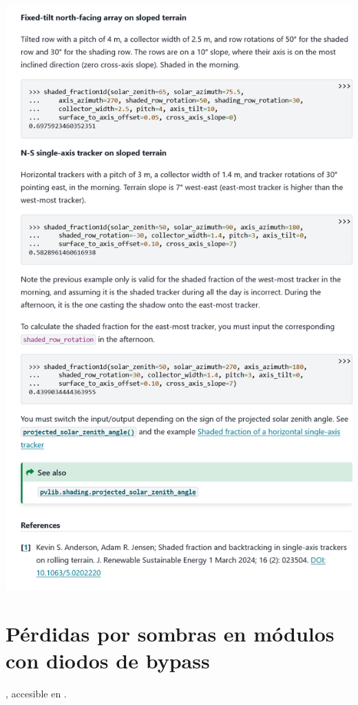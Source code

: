 \begin{myparindent}{0pt}
\includegraphics[width=\linewidth,height=0.9\textheight,keepaspectratio]{images/docs_funcs_cut/shaded_fraction1d_2.png}

\newpage\section{Pérdidas por sombras en módulos con diodos de bypass} \label{sct:doc_modelo_perdidas_sombra}

, accesible en .


\end{myparindent}
